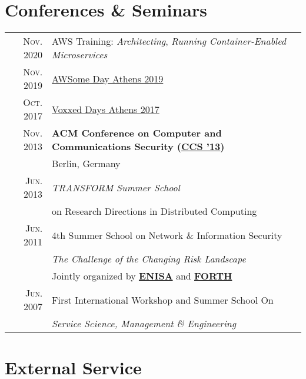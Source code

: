 \documentclass[a4paper,10pt]{article} %
\begin{document}
\section{Conferences \& Seminars}

\begin{tabular}{rl}

\textsc{Nov. 2020} & AWS Training: \emph {Architecting}, \emph {Running Container-Enabled Microservices} \\

\textsc{Nov. 2019} & \href{https://thebeat.co/en/blog/awsome-day-athens-2019/?intl=1}{AWSome Day Athens 2019} \\

\textsc{Oct. 2017} & \href{https://voxxeddays.com/athens17/}{Voxxed Days Athens 2017} \\

\textsc{Nov. 2013} & \textbf{ACM Conference on Computer and Communications Security (\href{http://www.sigsac.org/ccs/CCS2013/}{CCS '13})} \\
& Berlin, Germany \\

\textsc{Jun. 2013} & \emph{TRANSFORM Summer School} \\
& on Research Directions in Distributed Computing \\

\textsc{Jun. 2011} & 4th Summer School on Network \& Information Security \\
& \emph{The Challenge of the Changing Risk Landscape} \\
& \small Jointly organized by \textbf{\href{https://www.enisa.europa.eu/}{ENISA}} and \textbf{\href{https://www.forth.gr/}{FORTH}} \\

\textsc{Jun. 2007} & First International Workshop and Summer School On \\
& \emph{Service Science, Management \& Engineering}

\end{tabular}


\section{External Service}
\end{document}
